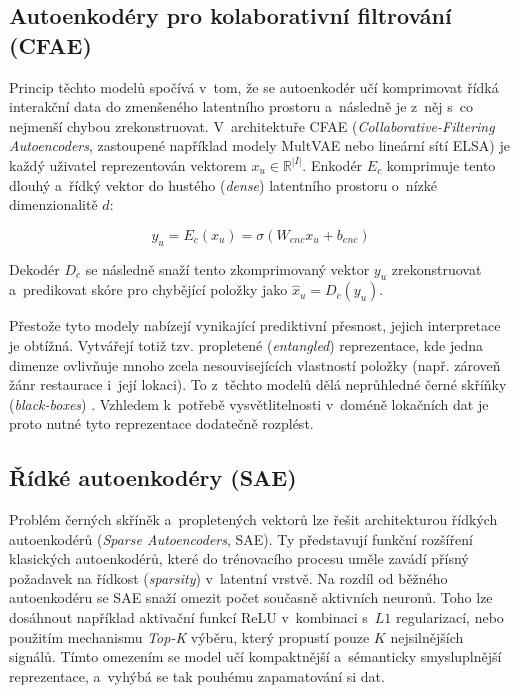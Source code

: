 \subsection{Autoenkodéry pro kolaborativní filtrování (CFAE)}
\label{subsec:cfae}

Princip těchto modelů spočívá v~tom, že se autoenkodér učí komprimovat řídká interakční data do zmenšeného latentního prostoru a~následně je z~něj s~co nejmenší chybou zrekonstruovat. V~architektuře CFAE (\textit{Collaborative-Filtering Autoencoders}, zastoupené například modely MultVAE nebo lineární sítí ELSA) je každý uživatel reprezentován vektorem $x_u \in \mathbb{R}^{|I|}$. Enkodér $E_c$ komprimuje tento dlouhý a~řídký vektor do hustého (\textit{dense}) latentního prostoru o~nízké dimenzionalitě $d$:

\begin{equation}
y_u = E_c(x_u) = \sigma(W_{enc} x_u + b_{enc})
\end{equation}

Dekodér $D_c$ se následně snaží tento zkomprimovaný vektor $y_u$ zrekonstruovat a~predikovat skóre pro chybějící položky jako $\hat{x}_u = D_c(y_u)$. 

Přestože tyto modely nabízejí vynikající prediktivní přesnost, jejich interpretace je obtížná. Vytvářejí totiž tzv. propletené (\textit{entangled}) reprezentace, kde jedna dimenze ovlivňuje mnoho zcela nesouvisejících vlastností položky (např. zároveň žánr restaurace i~její lokaci). To z~těchto modelů dělá neprůhledné černé skříňky (\textit{black-boxes}) \cite{Spisak2024}. Vzhledem k~potřebě vysvětlitelnosti v~doméně lokačních dat je proto nutné tyto reprezentace dodatečně rozplést.

\subsection{Řídké autoenkodéry (SAE)}
\label{subsec:sae}

Problém černých skříněk a~propletených vektorů lze řešit architekturou řídkých autoenkodérů (\textit{Sparse Autoencoders}, SAE). Ty představují funkční rozšíření klasických autoenkodérů, které do trénovacího procesu uměle zavádí přísný požadavek na řídkost (\textit{sparsity}) v~latentní vrstvě. Na rozdíl od běžného autoenkodéru se SAE snaží omezit počet současně aktivních neuronů. Toho lze dosáhnout například aktivační funkcí ReLU v~kombinaci s~$L1$ regularizací, nebo použitím mechanismu \textit{Top-K} výběru, který propustí pouze $K$ nejsilnějších signálů. Tímto omezením se model učí kompaktnější a~sémanticky smysluplnější reprezentace, a~vyhýbá se tak pouhému zapamatování si dat.

